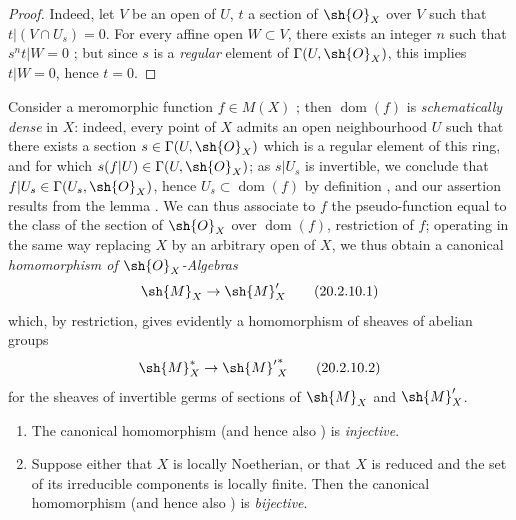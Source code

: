 \begin{proof}
Indeed, let $V$ be an open of $U$, $t$ a section of $\sh{O}_X$ over $V$ such that $t|(V\cap U_s)=0$.
For every affine open $W\subset V$, there exists an integer $n$ such that $s^n t|W=0$ ;
but since $s$ is a \emph{regular} element of $\Gamma(U,\sh{O}_X)$, this implies $t|W=0$, hence $t=0$.
\end{proof}

\begin{env}[20.2.10]
\label{IV.20.2.10}
Consider a meromorphic function $f\in M(X)$ ;
then $\operatorname{dom}(f)$ is \emph{schematically dense} in $X$:
indeed, every point of $X$ admits an open neighbourhood $U$ such that there exists a section $s\in\Gamma(U,\sh{O}_X)$ which is a regular element of this ring, and for which $s(f|U)\in\Gamma(U,\sh{O}_X)$;
as $s|U_s$ is invertible, we conclude that $f|U_s\in\Gamma(U_s,\sh{O}_X)$, hence $U_s\subset\operatorname{dom}(f)$ by definition , and our assertion results from the lemma .
We can thus associate to $f$ the pseudo-function equal to the class of the section of $\sh{O}_X$ over $\operatorname{dom}(f)$, restriction of $f$;
operating in the same way replacing $X$ by an arbitrary open of $X$, we thus obtain a canonical \emph{homomorphism of $\sh{O}_X$-Algebras}
\[
\label{IV.20.2.10.1}
  \sh{M}_X\to\sh{M}'_X
  \tag{20.2.10.1}
\]
which, by restriction, gives evidently a homomorphism of sheaves of abelian groups
\[
\label{IV.20.2.10.2}
  \sh{M}_X^*\to{\sh{M}'}^*_X
  \tag{20.2.10.2}
\]
for the sheaves of invertible germs of sections of $\sh{M}_X$ and $\sh{M}'_X$.
\end{env}

\begin{proposition}[20.2.11]
\label{IV.20.2.11}
\medskip
\begin{enumerate}[label=\emph{(\roman*)}]
  \item The canonical homomorphism \emph{} (and hence also \emph{}) is \emph{injective}.
  \item Suppose either that $X$ is locally Noetherian, or that $X$ is reduced and the set of its irreducible components is locally finite.
  Then the canonical homomorphism \emph{} (and hence also \emph{}) is \emph{bijective}.
\end{enumerate}
\end{proposition}


